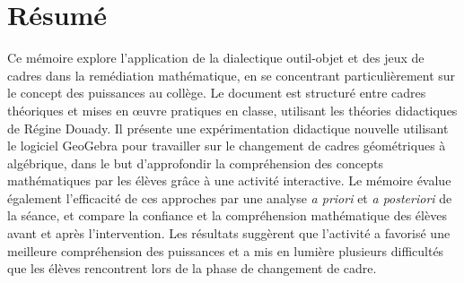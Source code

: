 \section*{Résumé}

Ce mémoire explore l'application de la dialectique outil-objet et des jeux de cadres dans la remédiation mathématique,
en se concentrant particulièrement sur le concept des puissances au collège.
Le document est structuré entre cadres théoriques et mises en œuvre pratiques en classe,
utilisant les théories didactiques de Régine Douady.
Il présente une expérimentation didactique nouvelle utilisant le logiciel GeoGebra pour travailler sur le changement de cadres géométriques à algébrique,
dans le but d'approfondir la compréhension des concepts mathématiques par les élèves grâce à une activité interactive.
Le mémoire évalue également l'efficacité de ces approches par une analyse \textit{a priori} et \textit{a posteriori} de la séance,
et compare la confiance et la compréhension mathématique des élèves avant et après l'intervention.
Les résultats suggèrent que l'activité a favorisé une meilleure compréhension des puissances et a mis en lumière plusieurs difficultés que les élèves rencontrent lors de la phase de changement de cadre.